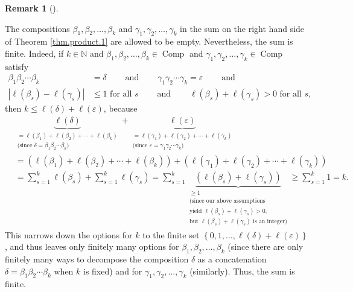 \documentclass[numbers=enddot,12pt,final,onecolumn,notitlepage]{scrartcl}%
\theoremstyle{definition}
\newtheorem{remk}[theo]{Remark}
\newenvironment{remark}[1][]
{\begin{remk}[#1]\begin{leftbar}}
{\end{leftbar}\end{remk}}
\let\sumnonlimits\sum
\renewcommand{\sum}{\sumnonlimits\limits}
\begin{document}
\begin{remark}
The compositions $\beta_{1},\beta_{2},\ldots,\beta_{k}$ and $\gamma_{1}%
,\gamma_{2},\ldots,\gamma_{k}$ in the sum on the right hand side of Theorem
\ref{thm.product.1} are allowed to be empty. Nevertheless, the sum is finite.
Indeed, if $k\in\mathbb{N}$ and $\beta_{1},\beta_{2},\ldots,\beta_{k}%
\in\operatorname*{Comp}$ and $\gamma_{1},\gamma_{2},\ldots,\gamma_{k}%
\in\operatorname*{Comp}$ satisfy%
\begin{align*}
\beta_{1}\beta_{2}\cdots\beta_{k}  &  =\delta\ \ \ \ \ \ \ \ \ \ \text{and}%
\ \ \ \ \ \ \ \ \ \ \gamma_{1}\gamma_{2}\cdots\gamma_{k}=\varepsilon
\ \ \ \ \ \ \ \ \ \ \text{and}\\
\left\vert \ell\left(  \beta_{s}\right)  -\ell\left(  \gamma_{s}\right)
\right\vert  &  \leq1\text{ for all }s\ \ \ \ \ \ \ \ \ \ \text{and}%
\ \ \ \ \ \ \ \ \ \ \ell\left(  \beta_{s}\right)  +\ell\left(  \gamma
_{s}\right)  >0\text{ for all }s,
\end{align*}
then $k\leq\ell\left(  \delta\right)  +\ell\left(  \varepsilon\right)  $,
because
\begin{align*}
&  \underbrace{\ell\left(  \delta\right)  }_{\substack{=\ell\left(  \beta
_{1}\right)  +\ell\left(  \beta_{2}\right)  +\cdots+\ell\left(  \beta
_{k}\right)  \\\text{(since }\delta=\beta_{1}\beta_{2}\cdots\beta_{k}\text{)}%
}}+\underbrace{\ell\left(  \varepsilon\right)  }_{\substack{=\ell\left(
\gamma_{1}\right)  +\ell\left(  \gamma_{2}\right)  +\cdots+\ell\left(
\gamma_{k}\right)  \\\text{(since }\varepsilon=\gamma_{1}\gamma_{2}%
\cdots\gamma_{k}\text{)}}}\\
&  =\left(  \ell\left(  \beta_{1}\right)  +\ell\left(  \beta_{2}\right)
+\cdots+\ell\left(  \beta_{k}\right)  \right)  +\left(  \ell\left(  \gamma
_{1}\right)  +\ell\left(  \gamma_{2}\right)  +\cdots+\ell\left(  \gamma
_{k}\right)  \right) \\
&  =\sum_{s=1}^{k}\ell\left(  \beta_{s}\right)  +\sum_{s=1}^{k}\ell\left(
\gamma_{s}\right)  =\sum_{s=1}^{k}\underbrace{\left(  \ell\left(  \beta
_{s}\right)  +\ell\left(  \gamma_{s}\right)  \right)  }_{\substack{\geq
1\\\text{(since our above assumptions}\\\text{yield }\ell\left(  \beta
_{s}\right)  +\ell\left(  \gamma_{s}\right)  >0\text{,}\\\text{but }%
\ell\left(  \beta_{s}\right)  +\ell\left(  \gamma_{s}\right)  \text{ is an
integer)}}}\geq\sum_{s=1}^{k}1=k.
\end{align*}
This narrows down the options for $k$ to the finite set $\left\{
0,1,\ldots,\ell\left(  \delta\right)  +\ell\left(  \varepsilon\right)
\right\}  $, and thus leaves only finitely many options for $\beta_{1}%
,\beta_{2},\ldots,\beta_{k}$ (since there are only finitely many ways to
decompose the composition $\delta$ as a concatenation $\delta=\beta_{1}%
\beta_{2}\cdots\beta_{k}$ when $k$ is fixed) and for $\gamma_{1},\gamma
_{2},\ldots,\gamma_{k}$ (similarly). Thus, the sum is finite.
\end{remark}
\end{document}
